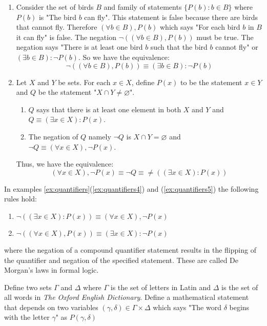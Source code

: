 \begin{example}
\begin{enumerate}
        \item Consider the set of birds $B$ and family of statements $\{P(b) : b \in B\}$ where $P(b)$ is "The bird $b$ can fly". This statement is false because there are birds that cannot fly. Therefore $(\forall b \in B), P(b)$ which says "For each bird $b$ in $B$ it can fly" is false. The negation $\neg ((\forall b \in B),P(b))$ must be true. The negation says "There is at least one bird $b$ such that the bird $b$ cannot fly" or $(\exists b \in B): \neg P(b)$. So we have the equivalence:
            $$
            \neg((\forall b \in B), P(b)) \equiv (\exists b \in B):\neg P(b)
            $$
            \label{ex:quantifiers4}

        \item Let $X$ and $Y$ be sets. For each $x \in X$, define $P(x)$ to be the statement $x \in Y$ and $Q$ be the statement "$X \cap Y \neq \varnothing$".
            \begin{enumerate}[label=(\alph*)]
                \item $Q$ says that there is at least one element in both $X$ and $Y$ and $Q \equiv (\exists x \in X): P(x)$.
                \item The negation of $Q$ namely $\neg Q$ is $X \cap Y = \varnothing$ and $\neg Q \equiv (\forall x \in X), \neg P(x)$.
            \end{enumerate}
            Thus, we have the equivalence: \label{ex:quantifiers5}
            $$
            (\forall x \in X), \neg P(x) \equiv \neg Q \equiv \neq((\exists x \in X) : P(x))
            $$
    \end{enumerate}
    \label{ex:quantifiers}
\end{example}

In examples \ref{ex:quantifiers}(\ref{ex:quantifiers4}) and (\ref{ex:quantifiers5}) the following rules hold:

\begin{enumerate}
    \item $\neg((\exists x \in X): P(x)) \equiv (\forall x \in X), \neg P(x)$
    \item $\neg((\forall x \in X), P(x)) \equiv (\exists x \in X): \neg P(x)$
\end{enumerate}

\noindent where the negation of a compound quantifier statement results in the flipping of the quantifier and negation of the specified statement. These are called De Morgan's laws in formal logic.

\begin{example}
    Define two sets $\Gamma$ and $\Delta$ where $\Gamma$ is the set of letters in Latin and $\Delta$ is the set of all words in \textit{The Oxford English Dictionary}. 
    Define a mathematical statement that depends on two variables $(\gamma,\delta) \in \Gamma \times \Delta$ which says "The word $\delta$ begins with the letter $\gamma$" as $P(\gamma,\delta)$

    
\end{example}